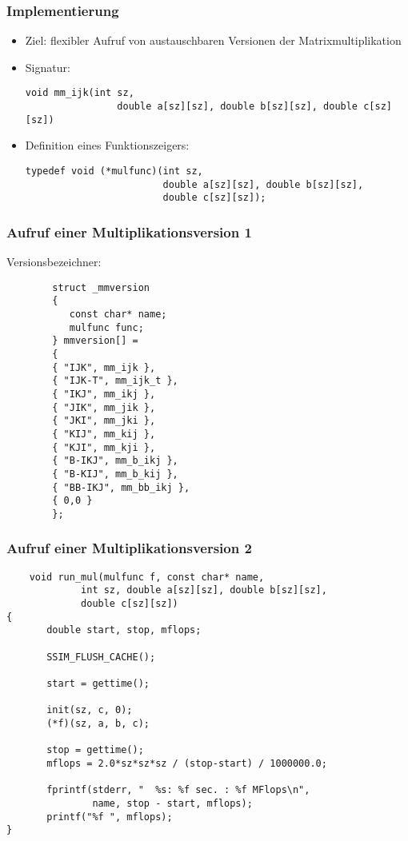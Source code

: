 
\begin{frame} [fragile] \frametitle{Implementierung}
	\begin{itemize}
	
	\item Ziel: flexibler Aufruf von austauschbaren Versionen der Matrixmultiplikation
	
	\item<2-> Signatur:
	\begin{lstlisting}[numbers=none]
	void mm_ijk(int sz,
	            double a[sz][sz], double b[sz][sz], double c[sz][sz])
	\end{lstlisting}
	
	\item<2-> Definition eines Funktionszeigers:
	\begin{lstlisting}[numbers=none]
	typedef void (*mulfunc)(int sz,
                        double a[sz][sz], double b[sz][sz],
                        double c[sz][sz]);
	\end{lstlisting}
	
	\end{itemize}
\end{frame}

\begin{frame} [fragile] \frametitle{Aufruf einer Multiplikationsversion 1}
	Versionsbezeichner:
		\begin{lstlisting}
		struct _mmversion
		{
		   const char* name;
		   mulfunc func;
		} mmversion[] =
		{
		{ "IJK", mm_ijk },
		{ "IJK-T", mm_ijk_t },
		{ "IKJ", mm_ikj },
		{ "JIK", mm_jik },
		{ "JKI", mm_jki },
		{ "KIJ", mm_kij },
		{ "KJI", mm_kji },
		{ "B-IKJ", mm_b_ikj },
		{ "B-KIJ", mm_b_kij },
		{ "BB-IKJ", mm_bb_ikj },
		{ 0,0 }
		};
		\end{lstlisting}
	
\end{frame}

\begin{frame} [fragile] \frametitle{Aufruf einer Multiplikationsversion 2}
	\begin{lstlisting}
	void run_mul(mulfunc f, const char* name,
             int sz, double a[sz][sz], double b[sz][sz],
             double c[sz][sz])
{
	   double start, stop, mflops;

	   SSIM_FLUSH_CACHE();
	   
	   start = gettime();
	   
	   init(sz, c, 0);
	   (*f)(sz, a, b, c);
	   
	   stop = gettime();
	   mflops = 2.0*sz*sz*sz / (stop-start) / 1000000.0;
	   
	   fprintf(stderr, "  %s: %f sec. : %f MFlops\n", 
	           name, stop - start, mflops);
	   printf("%f ", mflops);
}
	\end{lstlisting}
\end{frame}

